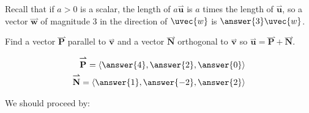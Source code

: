 \documentclass{ximera}
\begin{document}
\begin{exercise}
\begin{hint}
Recall that if $a>0$ is a scalar, the length of $a\overset{\boldsymbol{\rightharpoonup}}{\mathbf{u}}$ is $a$ times the length of $\overset{\boldsymbol{\rightharpoonup}}{\mathbf{u}}$, so a vector $\overset{\boldsymbol{\rightharpoonup}}{\mathbf{w}}$ of magnitude 3 in the direction of $\uvec{w}$ is $\answer{3}\uvec{w}$. 
\end{hint}

\begin{exercise}
Find a vector $\overset{\boldsymbol{\rightharpoonup}}{\mathbf{P}}$ parallel to $\overset{\boldsymbol{\rightharpoonup}}{\mathbf{v}}$ and a vector $\overset{\boldsymbol{\rightharpoonup}}{\mathbf{N}}$ orthogonal to $\overset{\boldsymbol{\rightharpoonup}}{\mathbf{v}}$ so $\overset{\boldsymbol{\rightharpoonup}}{\mathbf{u}} = \overset{\boldsymbol{\rightharpoonup}}{\mathbf{P}} +\overset{\boldsymbol{\rightharpoonup}}{\mathbf{N}}$.

\begin{align*}
\overset{\boldsymbol{\rightharpoonup}}{\mathbf{P}} = \left< \answer{4},\answer{2}, \answer{0} \right> \\
\overset{\boldsymbol{\rightharpoonup}}{\mathbf{N}}= \left< \answer{1},\answer{-2},\answer{2} \right> \\
\end{align*} 

\begin{hint}
 We should proceed by:
 
 \begin{multipleChoice}
 \end{multipleChoice}
 \end{hint}
 

\end{exercise}
\end{exercise}
\end{document}
